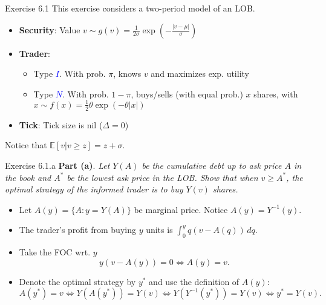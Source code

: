 \documentclass[english,10pt]{beamer}
\begin{document}
\begin{frame}[label=ex1]{Exercise 6.1}
	This exercise considers a two-period model of an LOB.
	\begin{itemize}
		\item \textbf{Security}: Value $v \sim g(v)=\frac{1}{2\sigma} \exp \left(-\frac{|v-\mu|}{\sigma}\right)$
		\item \textbf{Trader}: 
		\begin{itemize}
			\item Type \textcolor{blue}{$I$}. With prob. $\pi$, knows $v$ and maximizes exp. utility
			\item Type \textcolor{blue}{$N$}. With prob. $1-\pi$, buys/sells (with equal prob.) $x$ shares, with $x \sim f(x)=\frac{1}{2}\theta \exp(-\theta |x|)$ 
		\end{itemize}
		\item \textbf{Tick}: Tick size is nil ($\Delta=0$)
	\end{itemize}
	Notice that $\mathbb{E}[v|v \ge z]=z+\sigma$.
\end{frame}


\begin{frame}{Exercise 6.1.a}
	\textbf{Part (a)}. \textit{Let $Y(A)$ be the cumulative debt up to ask price $A$ in the book and $A^*$ be the lowest ask price in the LOB. Show that when $v \ge A^*$, the optimal strategy of the informed trader is to buy $Y(v)$ shares.}
	\begin{itemize}
		\item Let $A(y)=\{A: y=Y(A)\}$ be marginal price. Notice $A(y)=Y^{-1}(y)$.
		\item The trader's profit from buying $y$ units is $
		\int_0^y q(v-A(q)) \, dq.$
		\item Take the FOC wrt. $y$
		\[
		y(v-A(y))=0 \Leftrightarrow A(y)=v.
		\]
		\item Denote the optimal strategy by $y^*$ and use the definition of $A(y)$:
		\[
		A(y^*)=v \Leftrightarrow Y(A(y^*))=Y(v) \Leftrightarrow Y(Y^{-1}(y^*))=Y(v) \Leftrightarrow y^*= Y(v).
		\]
	\end{itemize}
\end{frame}
\end{document}
